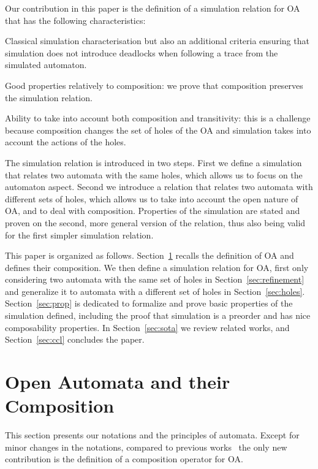 \documentclass[runningheads]{llncs}
\begin{document}
Our contribution in this paper is the definition of a simulation relation for OA that has the following characteristics:
\begin{compactitem}
\item Classical simulation characterisation but also an additional criteria ensuring that simulation does not introduce deadlocks when following a trace from the simulated automaton.
\item Good properties relatively to composition: we prove that composition preserves the simulation relation.
\item Ability to take into account both composition and transitivity: this is a challenge because composition changes the set of holes of the OA and simulation takes into account the actions of the holes.
\end{compactitem}
 The simulation relation is introduced in two steps. First we define a simulation that relates two automata with the same holes, which allows us to focus on the automaton aspect. Second we introduce a relation that relates two automata with different sets of holes, which allows us to take into account the open nature of OA, and to deal with composition. Properties of the simulation are stated and proven on the second, more general version of the relation,   thus also being valid  for the first simpler simulation relation.

This paper is organized as follows. Section~\ref{sec:background} recalls the definition of OA and defines their composition. 
We  then  define a simulation relation for OA, first only considering two automata with the same set of holes in Section~\ref{sec:refinement} and generalize it to automata with a different set of holes in Section~\ref{sec:holes}.  Section~\ref{sec:prop} is dedicated to formalize and prove basic properties of the simulation defined, including the proof that simulation is a preorder and has nice composability properties. 
In Section~\ref{sec:sota} we review related works, and Section~\ref{sec:ccl} concludes the paper.


\section{Open Automata and their Composition}\label{sec:background}

This section presents our notations and the principles of automata. Except for minor changes in the notations, compared to previous works~\cite{AMHEEMA:2023} the only new contribution is the definition of a composition operator for OA.
%
\end{document}
